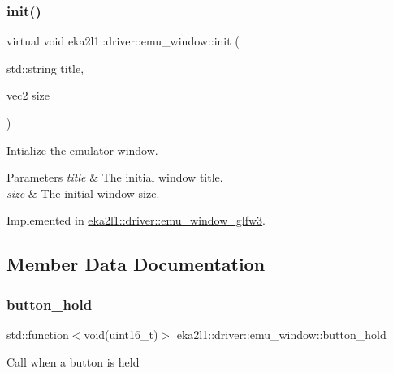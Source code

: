 \subsubsection{\texorpdfstring{init()}{init()}}
{\footnotesize\ttfamily virtual void eka2l1\+::driver\+::emu\+\_\+window\+::init (\begin{DoxyParamCaption}\item[{std\+::string}]{title,  }\item[{\mbox{\hyperlink{structeka2l1_1_1vec2}{vec2}}}]{size }\end{DoxyParamCaption})\hspace{0.3cm}{\ttfamily [pure virtual]}}



Intialize the emulator window. 


\begin{DoxyParams}{Parameters}
{\em title} & The initial window title. \\
\hline
{\em size} & The initial window size. \\
\hline
\end{DoxyParams}


Implemented in \mbox{\hyperlink{classeka2l1_1_1driver_1_1emu__window__glfw3_af2bfbaf8879c5ccb627c08aea9135073}{eka2l1\+::driver\+::emu\+\_\+window\+\_\+glfw3}}.



\subsection{Member Data Documentation}
\mbox{\label{classeka2l1_1_1driver_1_1emu__window_a87a730c6540ff96939c25b2ba2912e4c}} 
\subsubsection{\texorpdfstring{button\+\_\+hold}{button\_hold}}
{\footnotesize\ttfamily std\+::function$<$void(uint16\+\_\+t)$>$ eka2l1\+::driver\+::emu\+\_\+window\+::button\+\_\+hold}

Call when a button is held \mbox{\label{classeka2l1_1_1driver_1_1emu__window_aeda1056d81f9d4e309725b09fd97e365}} 
